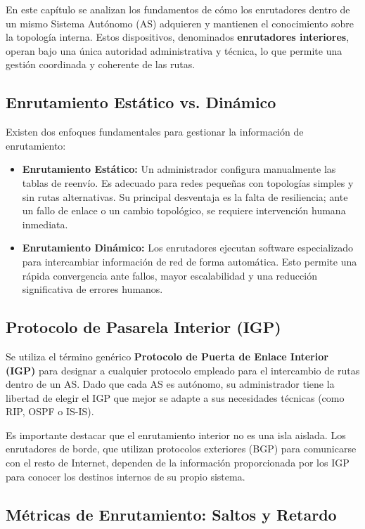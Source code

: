 En este capítulo se analizan los fundamentos de cómo los enrutadores dentro de un mismo Sistema Autónomo (AS) adquieren y mantienen el conocimiento sobre la topología interna. Estos dispositivos, denominados \textbf{enrutadores interiores}, operan bajo una única autoridad administrativa y técnica, lo que permite una gestión coordinada y coherente de las rutas.

\subsection{Enrutamiento Estático vs. Dinámico}

Existen dos enfoques fundamentales para gestionar la información de enrutamiento:

\begin{itemize}
    \item \textbf{Enrutamiento Estático:} Un administrador configura manualmente las tablas de reenvío. Es adecuado para redes pequeñas con topologías simples y sin rutas alternativas. Su principal desventaja es la falta de resiliencia; ante un fallo de enlace o un cambio topológico, se requiere intervención humana inmediata.
    \item \textbf{Enrutamiento Dinámico:} Los enrutadores ejecutan software especializado para intercambiar información de red de forma automática. Esto permite una rápida convergencia ante fallos, mayor escalabilidad y una reducción significativa de errores humanos.
\end{itemize}

\subsection{Protocolo de Pasarela Interior (IGP)}

Se utiliza el término genérico \textbf{Protocolo de Puerta de Enlace Interior (IGP)} para designar a cualquier protocolo empleado para el intercambio de rutas dentro de un AS. Dado que cada AS es autónomo, su administrador tiene la libertad de elegir el IGP que mejor se adapte a sus necesidades técnicas (como RIP, OSPF o IS-IS).

Es importante destacar que el enrutamiento interior no es una isla aislada. Los enrutadores de borde, que utilizan protocolos exteriores (BGP) para comunicarse con el resto de Internet, dependen de la información proporcionada por los IGP para conocer los destinos internos de su propio sistema.

\subsection{Métricas de Enrutamiento: Saltos y Retardo}

